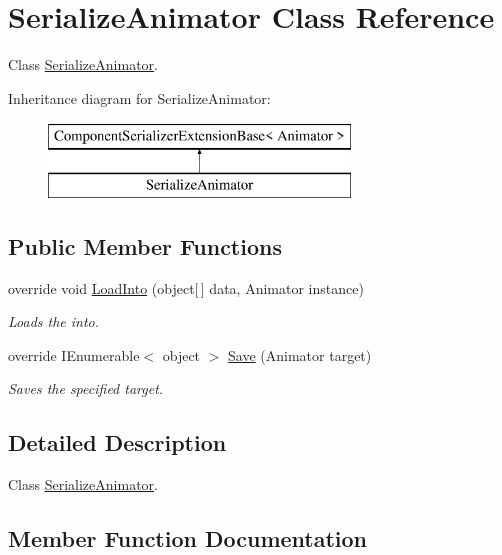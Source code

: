 \hypertarget{class_serialize_animator}{}\section{Serialize\+Animator Class Reference}
\label{class_serialize_animator}


Class \hyperlink{class_serialize_animator}{Serialize\+Animator}.  


Inheritance diagram for Serialize\+Animator\+:\begin{figure}[H]
\begin{center}
\leavevmode
\includegraphics[height=2.000000cm]{class_serialize_animator}
\end{center}
\end{figure}
\subsection*{Public Member Functions}
\begin{DoxyCompactItemize}
\item 
override void \hyperlink{class_serialize_animator_a8fcc5dfd72a04ceb6d729ead95007ef2}{Load\+Into} (object\mbox{[}$\,$\mbox{]} data, Animator instance)
\begin{DoxyCompactList}\small\item\em Loads the into. \end{DoxyCompactList}\item 
override I\+Enumerable$<$ object $>$ \hyperlink{class_serialize_animator_a1b0623fd6936bdb19d45bca748e3a7d8}{Save} (Animator target)
\begin{DoxyCompactList}\small\item\em Saves the specified target. \end{DoxyCompactList}\end{DoxyCompactItemize}


\subsection{Detailed Description}
Class \hyperlink{class_serialize_animator}{Serialize\+Animator}. 



\subsection{Member Function Documentation}
\mbox{\label{class_serialize_animator_a8fcc5dfd72a04ceb6d729ead95007ef2}} 
